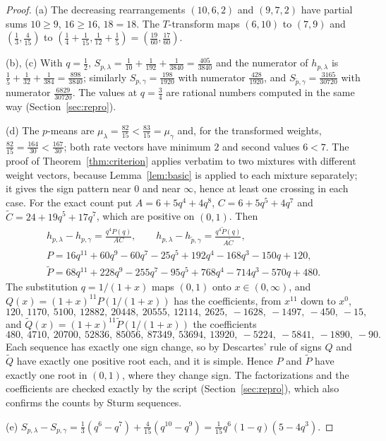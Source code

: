 \documentclass[10pt]{article}
\theoremstyle{plain}
\theoremstyle{definition}
\theoremstyle{remark}
\begin{document}
\begin{proof}
(a) The decreasing rearrangements $(10,6,2)$ and $(9,7,2)$ have partial sums $10\ge 9$, $16\ge 16$, $18=18$. The $T$-transform maps $(6,10)$ to $(7,9)$ and $(\tfrac13,\tfrac4{15})$ to $(\tfrac14+\tfrac1{15},\tfrac1{12}+\tfrac15)=(\tfrac{19}{60},\tfrac{17}{60})$.

(b), (c) With $q=\tfrac12$, $S_{p,\lambda}=\tfrac1{10}+\tfrac1{192}+\tfrac1{3840}=\tfrac{405}{3840}$ and the numerator of $h_{p,\lambda}$ is $\tfrac15+\tfrac1{32}+\tfrac1{384}=\tfrac{898}{3840}$; similarly $S_{p,\gamma}=\tfrac{198}{1920}$ with numerator $\tfrac{428}{1920}$, and $S_{\tilde p,\gamma}=\tfrac{3165}{30720}$ with numerator $\tfrac{6829}{30720}$. The values at $q=\tfrac34$ are rational numbers computed in the same way (Section~\ref{sec:repro}).

(d) The $p$-means are $\mu_\lambda=\tfrac{82}{15}<\tfrac{83}{15}=\mu_\gamma$ and, for the transformed weights, $\tfrac{82}{15}=\tfrac{164}{30}<\tfrac{167}{30}$; both rate vectors have minimum $2$ and second values $6<7$. The proof of Theorem~\ref{thm:criterion} applies verbatim to two mixtures with different weight vectors, because Lemma~\ref{lem:basic} is applied to each mixture separately; it gives the sign pattern near $0$ and near $\infty$, hence at least one crossing in each case. For the exact count put $A=6+5q^4+4q^8$, $C=6+5q^5+4q^7$ and $\tilde C=24+19q^5+17q^7$, which are positive on $(0,1)$. Then
\begin{gather*}
h_{p,\lambda}-h_{p,\gamma}=\frac{q^4P(q)}{AC},\qquad h_{p,\lambda}-h_{\tilde p,\gamma}=\frac{q^4\tilde P(q)}{A\tilde C},\\
P=16q^{11}+60q^9-60q^7-25q^5+192q^4-168q^3-150q+120,\\
\tilde P=68q^{11}+228q^9-255q^7-95q^5+768q^4-714q^3-570q+480.
\end{gather*}
The substitution $q=1/(1+x)$ maps $(0,1)$ onto $x\in(0,\infty)$, and $Q(x)=(1+x)^{11}P(1/(1+x))$ has the coefficients, from $x^{11}$ down to $x^0$,
\[
120,\ 1170,\ 5100,\ 12882,\ 20448,\ 20555,\ 12114,\ 2625,\ -1628,\ -1497,\ -450,\ -15,
\]
and $\tilde Q(x)=(1+x)^{11}\tilde P(1/(1+x))$ the coefficients
\[
480,\ 4710,\ 20700,\ 52836,\ 85056,\ 87349,\ 53694,\ 13920,\ -5224,\ -5841,\ -1890,\ -90 .
\]
Each sequence has exactly one sign change, so by Descartes' rule of signs $Q$ and $\tilde Q$ have exactly one positive root each, and it is simple. Hence $P$ and $\tilde P$ have exactly one root in $(0,1)$, where they change sign. The factorizations and the coefficients are checked exactly by the script (Section~\ref{sec:repro}), which also confirms the counts by Sturm sequences.

(e) $S_{p,\lambda}-S_{p,\gamma}=\tfrac13(q^6-q^7)+\tfrac4{15}(q^{10}-q^9)=\tfrac1{15}q^6(1-q)(5-4q^3)$.
\end{proof}
\end{document}
